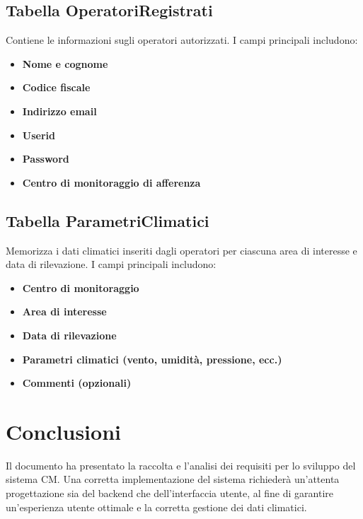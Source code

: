 \documentclass[a4paper,12pt]{article}
\begin{document}
\subsection{Tabella OperatoriRegistrati}
Contiene le informazioni sugli operatori autorizzati. I campi principali includono:
\begin{itemize}
    \item \textbf{Nome e cognome}
    \item \textbf{Codice fiscale}
    \item \textbf{Indirizzo email}
    \item \textbf{Userid}
    \item \textbf{Password}
    \item \textbf{Centro di monitoraggio di afferenza}
\end{itemize}

\subsection{Tabella ParametriClimatici}
Memorizza i dati climatici inseriti dagli operatori per ciascuna area di interesse e data di rilevazione. I campi principali includono:
\begin{itemize}
    \item \textbf{Centro di monitoraggio}
    \item \textbf{Area di interesse}
    \item \textbf{Data di rilevazione}
    \item \textbf{Parametri climatici (vento, umidità, pressione, ecc.)}
    \item \textbf{Commenti (opzionali)}
\end{itemize}

\section{Conclusioni}
Il documento ha presentato la raccolta e l'analisi dei requisiti per lo sviluppo del sistema CM. Una corretta implementazione del sistema richiederà un'attenta progettazione sia del backend che dell'interfaccia utente, al fine di garantire un'esperienza utente ottimale e la corretta gestione dei dati climatici.
\end{document}
